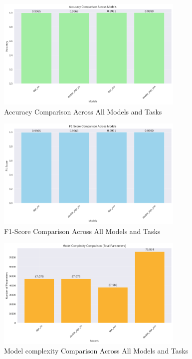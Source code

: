 \documentclass[16pt]{report}
\begin{document}
\begin{figure}[H]
    \centering
    \includegraphics[width=0.8\textwidth]{images/accuracy_comparison.png} %
    \caption{Accuracy Comparison Across All Models and Tasks}
    \label{fig:accuracy_comparison}
\end{figure}
\begin{figure}[H]
    \centering
    \includegraphics[width=0.8\textwidth]{images/f1_score_comparison.png} %
    \caption{F1-Score Comparison Across All Models and Tasks}
    \label{fig:accuracy_comparison}
\end{figure}
\begin{figure}[H]
    \centering
    \includegraphics[width=0.8\textwidth]{images/model_complexity_comparison.png} %
    \caption{Model complexity Comparison Across All Models and Tasks}
    \label{fig:model_complexity_comparison}
\end{figure}
\end{document}
